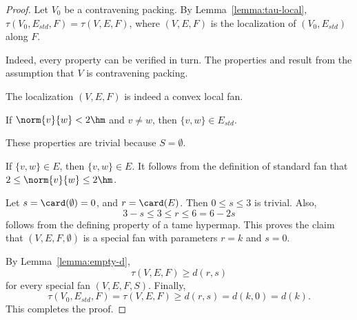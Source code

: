 \begin{proof}
  Let $V_0$ be a contravening packing.  By
  Lemma~\ref{lemma:tau-local}, $\tau(V_0,E_{std},F)=\tau(V,E,F)$, where
  $(V,E,F)$ is the localization of $(V_0,E_{std})$ along $F$.

    Indeed,
  every property can be verified in turn.  The properties
   and  result from the assumption that
  $V$ is contravening packing.

  The localization $(V,E,F)$ is indeed a convex local fan.

 If $\norm{v}{w}<2\hm$ and $v\ne w$, then $\{v,w\}\in
E_{std}$.

  These properties are trivial because
$S=\emptyset$.

 If $\{v,w\}\in E$, then $\{v,w\}\in E$.  It follows from
the definition of standard fan that $2\le \norm{v}{w}\le 2\hm$.

 Let $s=\card(\emptyset) = 0$, and $r=\card(E)$.  Then
$0\le s\le 3$ is trivial. Also,
\[ 3-s \le 3\le r \le 6=6 - 2s\] 
follows from the defining property  of a tame
hypermap.  This proves the claim that $(V,E,F,\emptyset)$ is a special fan with parameters $r=k$ and $s=0$.

By Lemma~\ref{lemma:empty-d}, 
\[ 
\tau(V,E,F) \ge d (r,s)
\] 
for every special fan $(V,E,F,S)$. 
Finally, 
\[ 
\tau(V_0,E_{std},F)=\tau(V,E,F) \ge d(r,s) = d(k,0) = d(k).
\]   
This completes the proof.
\end{proof}



